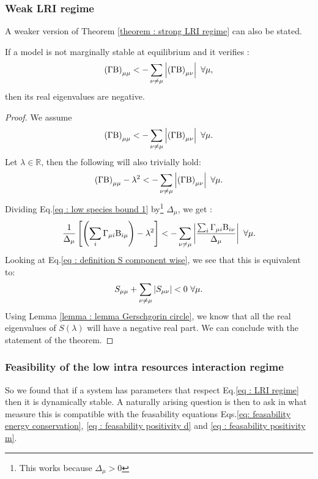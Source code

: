 \documentclass[12pt, titlepage]{report}
\begin{document}
\subsubsection{Weak LRI regime}
A weaker version of Theorem \ref{theorem : strong LRI regime} can also be stated.
\begin{theorem}\label{theorem : weak LRI regime}
If a model is not marginally stable at equilibrium and it verifies :
\begin{equation}
\left(\Gamma \text{B}\right)_{\mu\mu} < - \sum_{\nu \neq \mu } \left|{\left(\Gamma \text{B}\right)_{\mu \nu}}\right| \ \forall \mu,
\end{equation}
then its real eigenvalues are negative.
\end{theorem}
\begin{proof}
We assume
\begin{equation}
\left(\Gamma \text{B}\right)_{\mu\mu} < - \sum_{\nu \neq \mu } \left|{\left(\Gamma \text{B}\right)_{\mu \nu}}\right|  \ \forall \mu.
\end{equation}
Let $\lambda \in \mathbb{R}$, then the following will also trivially hold:
\begin{equation}
  \left(\Gamma\Beta \right)_{\mu\mu} -\lambda^2 < - \sum_{\nu \neq \mu } \abs{\left(\Gamma \Beta\right)_{\mu \nu}} \ \forall \mu. \label{eq : low species bound 1}
\end{equation}
Dividing Eq.\eqref{eq : low species bound 1} by\footnote{This works because $\Delta_\mu > 0$} $\Delta_\mu$, we get :
\begin{equation}
\frac{1}{\Delta_\mu}\left[\left(\sum_i \Gamma_{\mu i} \Beta_{i \mu} \right)-{\lambda^2}\right] < - \sum_{\nu \neq \mu } \abs{\frac{\sum_i \Gamma_{\mu i}\Beta_{i\nu}}{\Delta_\mu}} \ \forall \mu.
\end{equation}
Looking at Eq.\eqref{eq : definition S component wise}, we see that this is equivalent to:
\begin{equation}
S_{\mu \mu} + \sum_{\nu \neq \mu} \left|{S_{\mu \nu}}\right| < 0\ \forall \mu.
\end{equation}
Using Lemma \ref{lemma : lemma Gerschgorin circle}, we know that all the real eigenvalues of $S(\lambda)$ will have a negative real part.
We can conclude with the statement of the theorem.
\end{proof}



\subsubsection{Feasibility of the low intra resources interaction regime}
So we found that if a system has parameters that respect Eq.\eqref{eq : LRI regime} then it is dynamically stable. A naturally arising question is then to ask in what measure this is compatible with the feasability equations Eqs.\eqref{eq: feasability energy conservation}, \eqref{eq : feasability positivity d} and \eqref{eq : feasability positivity m}.
\end{document}
